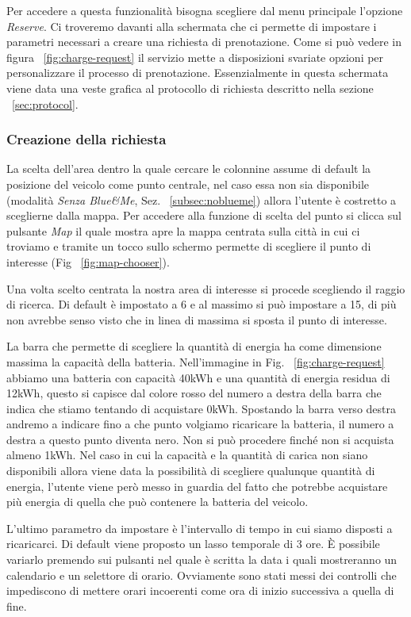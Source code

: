 Per accedere a questa funzionalità bisogna scegliere dal menu principale l'opzione \emph{Reserve}. Ci troveremo davanti alla schermata che ci permette di impostare i parametri necessari a creare una richiesta di prenotazione. Come si può vedere in figura ~\ref{fig:charge-request} il servizio mette a disposizioni svariate opzioni per personalizzare il processo di prenotazione. Essenzialmente in questa schermata viene data una veste grafica al protocollo di richiesta descritto nella sezione ~\ref{sec:protocol}.

\subsubsection{Creazione della richiesta}

La scelta dell'area dentro la quale cercare le colonnine assume di default la posizione del veicolo come punto centrale, nel caso essa non sia disponibile (modalità \emph{Senza Blue\&{}Me}, Sez. ~\ref{subsec:noblueme}) allora l'utente è costretto a sceglierne dalla mappa. Per accedere alla funzione di scelta del punto si clicca sul pulsante \emph{Map} il quale mostra apre la mappa centrata sulla città in cui ci troviamo e tramite un tocco sullo schermo permette di scegliere il punto di interesse (Fig ~\ref{fig:map-chooser}).

Una volta scelto centrata la nostra area di interesse si procede scegliendo il raggio di ricerca. Di default è impostato a 6 e al massimo si può impostare a 15, di più non avrebbe senso visto che in linea di massima si sposta il punto di interesse.

La barra che permette di scegliere la quantità di energia ha come dimensione massima la capacità della batteria. Nell'immagine in Fig. ~\ref{fig:charge-request} abbiamo una batteria con capacità 40kWh e una quantità di energia residua di 12kWh, questo si capisce dal colore rosso del numero a destra della barra che indica che stiamo tentando di acquistare 0kWh. Spostando la barra verso destra andremo a indicare fino a che punto volgiamo ricaricare la batteria, il numero a destra a questo punto diventa nero. Non si può procedere finché non si acquista almeno 1kWh. 
Nel caso in cui la capacità e la quantità di carica non siano disponibili allora viene data la possibilità di scegliere qualunque quantità di energia, l'utente viene però messo in guardia del fatto che potrebbe acquistare più energia di quella che può contenere la batteria del veicolo.

L'ultimo parametro da impostare è l'intervallo di tempo in cui siamo disposti a ricaricarci. Di default viene proposto un lasso temporale di 3 ore. È possibile variarlo premendo sui pulsanti nel quale è scritta la data i quali mostreranno un calendario e un selettore di orario. Ovviamente sono stati messi dei controlli che impediscono di mettere orari incoerenti come ora di inizio successiva a quella di fine.

